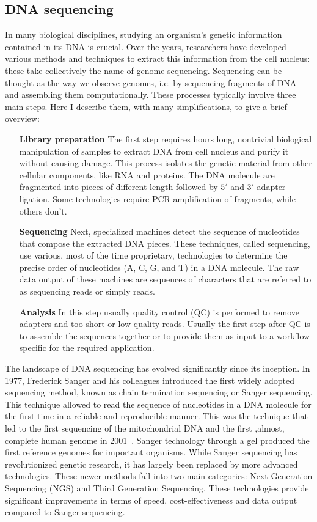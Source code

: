 \subsection{DNA sequencing}
In many biological disciplines, studying an organism's genetic information contained in its DNA is crucial. Over the years, researchers have developed various methods and techniques to extract this information from the cell nucleus: these take collectively the name of genome sequencing. Sequencing can be thought as the way we observe genomes, i.e. by sequencing fragments of DNA and assembling them computationally\cite{garrison_pangenome}. 
These processes typically involve three main steps. Here I describe them, with many simplifications, to give a brief overview:
\begin{itemize}[leftmargin=1.8cm]
	\item[\textbf{Library preparation}] The first step requires hours long, nontrivial biological manipulation of samples to extract DNA from cell nucleus and purify it without causing damage. This process isolates the genetic material from other cellular components, like RNA and proteins. The DNA molecule are fragmented into pieces of different length followed by $5\prime$ and $3\prime$ adapter ligation. Some technologies require PCR amplification of fragments, while others don't.
	\item[\textbf{Sequencing}] Next, specialized machines detect the sequence of nucleotides that compose the extracted DNA pieces. These techniques, called sequencing, use various, most of the time proprietary, technologies to determine the precise order of nucleotides (A, C, G, and T) in a DNA molecule. The raw data output of these machines are sequences of characters that are referred to as sequencing reads or simply reads.
	\item[\textbf{Analysis}] In this step usually quality control (QC) is performed to remove adapters and too short or low quality reads. Usually the first step after QC is to assemble the sequences together or to provide them as input to a workflow specific for the required application.
\end{itemize}
The landscape of DNA sequencing has evolved significantly since its inception. In 1977, Frederick Sanger and his colleagues introduced the first widely adopted sequencing method, known as chain termination sequencing or Sanger sequencing\cite{sanger_sequencing}. This technique allowed to read the sequence of nucleotides in a DNA molecule for the first time in a reliable and reproducible manner. This was the technique that led to the first sequencing of the mitochondrial DNA and the first ,almost, complete human genome in 2001~\cite{mitochondrialDNA,first_human_genome}. Sanger technology through a gel produced the first reference genomes for important organisms.
While Sanger sequencing has revolutionized genetic research, it has largely been replaced by more advanced technologies. These newer methods fall into two main categories: Next Generation Sequencing (NGS) and Third Generation Sequencing. These technologies provide significant improvements in terms of speed, cost-effectiveness and data output compared to Sanger sequencing. \\
